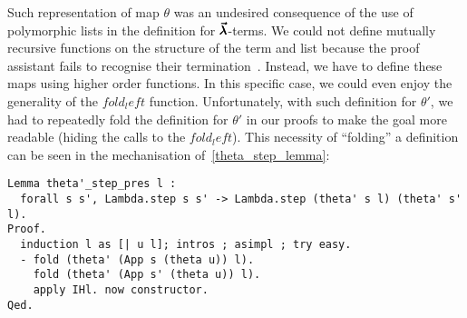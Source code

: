 Such representation of map $\theta$ was an undesired consequence of the use of polymorphic lists in the definition for $\pmb{\vec \lambda}$-terms.
We could not define mutually recursive functions on the structure of the term and list because the proof assistant fails to recognise their termination~\cite{YvesStackOverflow}.
Instead, we have to define these maps using higher order functions.
In this specific case, we could even enjoy the generality of the \lst$fold_left$ function.
Unfortunately, with such definition for $\theta'$, we had to repeatedly fold the definition for $\theta'$ in our proofs to make the goal more readable (hiding the calls to the \lst$fold_left$).
This necessity of ``folding'' a definition can be seen in the mechanisation of~\cref{theta_step_lemma}:
\begin{lstlisting}[language=Coq]
Lemma theta'_step_pres l :
  forall s s', Lambda.step s s' -> Lambda.step (theta' s l) (theta' s' l).
Proof.
  induction l as [| u l]; intros ; asimpl ; try easy.
  - fold (theta' (App s (theta u)) l).
    fold (theta' (App s' (theta u)) l).
    apply IHl. now constructor.
Qed.
\end{lstlisting}



